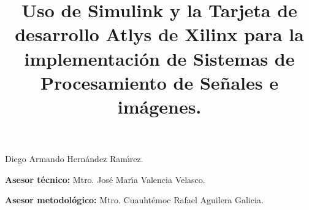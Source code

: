 
\title{\textbf{Uso de Simulink y la Tarjeta de desarrollo Atlys de Xilinx
para la implementaci\'{o}n de Sistemas de Procesamiento de Se\~{n}ales
e im\'{a}genes.}}

\maketitle
\vspace{1cm}

\begin{center}
Diego Armando Hern\'{a}ndez Ram\'{\i}rez.
\par\end{center}

\begin{center}
\textbf{Asesor t\'{e}cnico:} Mtro. Jos\'{e} Mar\'{\i}a Valencia Velasco.
\par\end{center}

\begin{center}
\textbf{Asesor metodol\'{o}gico:} Mtro. Cuauht\'{e}moc Rafael Aguilera
Galicia.
\par\end{center}

\thispagestyle{empty} 

\newpage{}
